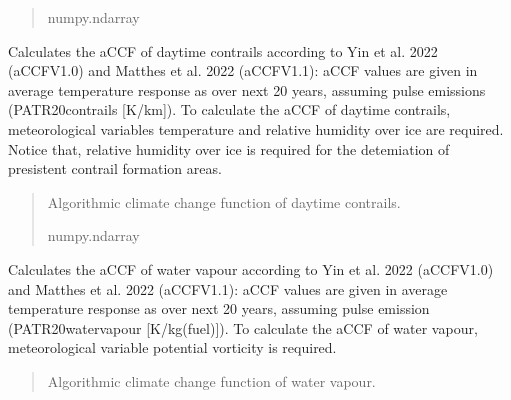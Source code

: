 \documentclass[a4paper,11pt,english]{sphinxmanual}
\begin{document}
\begin{fulllineitems}
\begin{fulllineitems}
\begin{quote}
\begin{description}
\sphinxAtStartPar
numpy.ndarray

\end{description}\end{quote}

\end{fulllineitems}


\begin{fulllineitems}
\label{\detokenize{modules:envlib.accf.GeTaCCFs.accf_dcontrail}}
\pysigstartsignatures
{}
\pysigstopsignatures
\sphinxAtStartPar
Calculates the aCCF of day\sphinxhyphen{}time contrails according to Yin et al. 2022 (aCCF\sphinxhyphen{}V1.0) and Matthes et al. 2022 (aCCF\sphinxhyphen{}V1.1): aCCF values are  given in average 
temperature response as over next 20 years, assuming pulse emissions (P\sphinxhyphen{}ATR20\sphinxhyphen{}contrails {[}K/km{]}). To calculate the aCCF of day\sphinxhyphen{}time contrails,
meteorological variables temperature and relative humidity over ice are required. Notice that,
relative humidity over ice is required for the detemiation of presistent contrail formation areas.
\begin{quote}\begin{description}
\sphinxAtStartPar
Algorithmic climate change function of day\sphinxhyphen{}time contrails.

\sphinxAtStartPar
numpy.ndarray

\end{description}\end{quote}

\end{fulllineitems}


\begin{fulllineitems}
\label{\detokenize{modules:envlib.accf.GeTaCCFs.accf_h2o}}
\pysigstartsignatures
{}
\pysigstopsignatures
\sphinxAtStartPar
Calculates the aCCF of water vapour according to Yin et al. 2022 (aCCF\sphinxhyphen{}V1.0) and Matthes et al. 2022 (aCCF\sphinxhyphen{}V1.1): aCCF values are  given in average 
temperature response as over next 20 years, assuming pulse emission (P\sphinxhyphen{}ATR20\sphinxhyphen{}water\sphinxhyphen{}vapour {[}K/kg(fuel){]}). To calculate the aCCF of water vapour,
meteorological variable potential vorticity is required.
\begin{quote}\begin{description}
\sphinxAtStartPar
Algorithmic climate change function of water vapour.


\end{description}
\end{quote}
\end{fulllineitems}
\end{fulllineitems}
\end{document}
